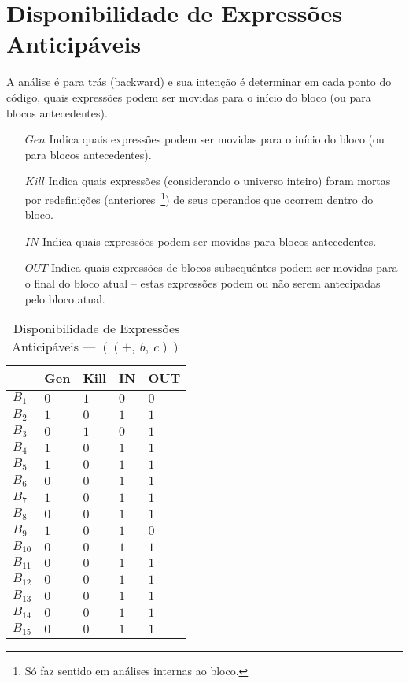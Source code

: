 \section{Disponibilidade de Express\~oes Anticip\'aveis}

A an\'alise \'e para tr\'as (\textsf{backward}) e sua inten\c{c}\~ao \'e determinar em cada ponto do c\'odigo, quais express\~oes podem ser movidas para o in\'icio do bloco (ou para blocos antecedentes).
\begin{itemize}
  \item[$Gen$] Indica quais express\~oes podem ser movidas para o in\'icio do bloco (ou para blocos antecedentes).
  \item[$Kill$] Indica quais express\~oes (considerando o universo inteiro) foram mortas por redefini\c{c}\~oes (anteriores~\footnote{S\'o faz sentido em an\'alises internas ao bloco.}) de seus operandos que ocorrem dentro do bloco.
  \item[$IN$] Indica quais express\~oes podem ser movidas para blocos antecedentes.
  \item[$OUT$] Indica quais express\~oes de blocos subsequ\^entes podem ser movidas para o final do bloco atual -- estas express\~oes podem ou n\~ao serem antecipadas pelo bloco atual.
\end{itemize}

\begin{table}[ht]
\centering
\begin{tabular}{l|l|l|l|l}
	& Gen & Kill & IN & OUT\\
\hline
$B_{1}$ &  $0$ & $1$ & $0$ & $0$\\
$B_{2}$ &  $1$ & $0$ & $1$ & $1$\\
$B_{3}$ &  $0$ & $1$ & $0$ & $1$\\
$B_{4}$ &  $1$ & $0$ & $1$ & $1$\\
$B_{5}$ &  $1$ & $0$ & $1$ & $1$\\
$B_{6}$ &  $0$ & $0$ & $1$ & $1$\\
$B_{7}$ &  $1$ & $0$ & $1$ & $1$\\
$B_{8}$ &  $0$ & $0$ & $1$ & $1$\\
$B_{9}$ &  $1$ & $0$ & $1$ & $0$\\
$B_{10}$ &  $0$ & $0$ & $1$ & $1$\\
$B_{11}$ &  $0$ & $0$ & $1$ & $1$\\
$B_{12}$ &  $0$ & $0$ & $1$ & $1$\\
$B_{13}$ &  $0$ & $0$ & $1$ & $1$\\
$B_{14}$ &  $0$ & $0$ & $1$ & $1$\\
$B_{15}$ &  $0$ & $0$ & $1$ & $1$\\
\end{tabular}
\caption{Disponibilidade de Express\~oes Anticip\'aveis --- $((+,\:b,\:c))$}
\end{table}

